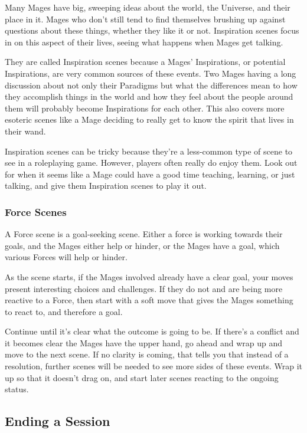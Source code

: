 \documentclass[
  oneside,
  statementpaper,
  9pt]{memoir}
\begin{document}
Many Mages have big, sweeping ideas about the world, the Universe, and
their place in it. Mages who don't still tend to find themselves
brushing up against questions about these things, whether they like it
or not. Inspiration scenes focus in on this aspect of their lives,
seeing what happens when Mages get talking.

They are called Inspiration scenes because a Mages' Inspirations, or
potential Inspirations, are very common sources of these events. Two
Mages having a long discussion about not only their Paradigms but what
the differences mean to how they accomplish things in the world and how
they feel about the people around them will probably become Inspirations
for each other. This also covers more esoteric scenes like a Mage
deciding to really get to know the spirit that lives in their wand.

Inspiration scenes can be tricky because they're a less-common type of
scene to see in a roleplaying game. However, players often really do
enjoy them. Look out for when it seems like a Mage could have a good
time teaching, learning, or just talking, and give them Inspiration
scenes to play it out.

\hypertarget{force-scenes}{%
\subsubsection{Force Scenes}\label{force-scenes}}

A Force scene is a goal-seeking scene. Either a force is working towards
their goals, and the Mages either help or hinder, or the Mages have a
goal, which various Forces will help or hinder.

As the scene starts, if the Mages involved already have a clear goal,
your moves present interesting choices and challenges. If they do not
and are being more reactive to a Force, then start with a soft move that
gives the Mages something to react to, and therefore a goal.

Continue until it's clear what the outcome is going to be. If there's a
conflict and it becomes clear the Mages have the upper hand, go ahead
and wrap up and move to the next scene. If no clarity is coming, that
tells you that instead of a resolution, further scenes will be needed to
see more sides of these events. Wrap it up so that it doesn't drag on,
and start later scenes reacting to the ongoing status.

\hypertarget{ending-a-session}{%
\subsection{Ending a Session}\label{ending-a-session}}
\end{document}
